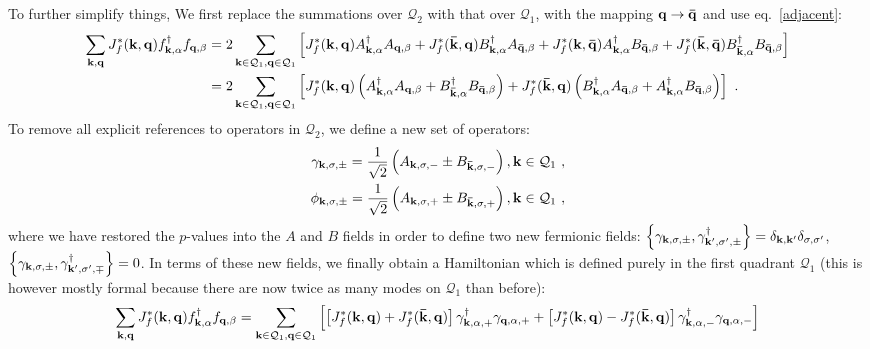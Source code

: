 \documentclass[%
reprint,
superscriptaddress,
groupedaddress,
superscriptaddress,
onecolumn,
10pt
]{revtex4-2}
\begin{document}
To further simplify things, We first replace the summations over \(\mathcal{Q}_2\) with that over \(\mathcal{Q}_1\), with the mapping \({\bf q} \to {\bf \bar q}\) and use eq.~\ref{adjacent}:
\begin{equation}\begin{aligned}
	\sum_{{\bf k}, {\bf q}} J_f^*({\bf k},{\bf q}) f^\dagger_{{\bf k},\alpha}f_{{\bf q},\beta} 
	&= 2\sum_{{\bf k} \in \mathcal{Q}_1, {\bf q} \in \mathcal{Q}_1} \left[J_f^*({\bf k},{\bf q}) A^\dagger_{{\bf k},\alpha}A_{{\bf q},\beta} + J_f^*({\bf \bar k},{\bf q}) B^\dagger_{{\bf k},\alpha}A_{{\bf \bar q},\beta} + J_f^*({\bf k},{\bf \bar q}) A^\dagger_{{\bf k},\alpha}B_{{\bf \bar q},\beta} + J_f^*({\bf \bar k},{\bf \bar q}) B^\dagger_{{\bf \bar k},\alpha}B_{{\bf \bar q},\beta}\right]\\
	&= 2\sum_{{\bf k} \in \mathcal{Q}_1, {\bf q} \in \mathcal{Q}_1} \left[J_f^*({\bf k},{\bf q}) \left(A^\dagger_{{\bf k},\alpha}A_{{\bf q},\beta} + B^\dagger_{{\bf \bar k},\alpha}B_{{\bf \bar q},\beta}\right) + J_f^*({\bf \bar k},{\bf q}) \left(B^\dagger_{{\bf k},\alpha}A_{{\bf \bar q},\beta} + A^\dagger_{{\bf k},\alpha}B_{{\bf \bar q},\beta}\right)\right] ~.
\end{aligned}\end{equation}
To remove all explicit references to operators in \(\mathcal{Q}_2\), we define a new set of operators:
\begin{equation}\begin{aligned}\label{defineGamma}
	\gamma_{{\bf k},\sigma,\pm} = \frac{1}{\sqrt{2}}\left(A_{{\bf k},\sigma,-} \pm B_{{\bf \bar k},\sigma,-}\right), {\bf k}\in \mathcal{Q}_1~,\\
	\phi_{{\bf k},\sigma,\pm} = \frac{1}{\sqrt{2}}\left(A_{{\bf k},\sigma,+} \pm B_{{\bf \bar k},\sigma,+}\right), {\bf k}\in \mathcal{Q}_1~,
\end{aligned}\end{equation}
where we have restored the \(p\)-values into the \(A\) and \(B\) fields in order to define two new fermionic fields: \(\left\{\gamma_{{\bf k},\sigma,\pm}, \gamma_{{\bf k}^\prime,\sigma^\prime,\pm}^\dagger\right\} = \delta_{{\bf k},{\bf k}^\prime}\delta_{\sigma,\sigma^\prime}\), \(\left\{\gamma_{{\bf k},\sigma,\pm}, \gamma_{{\bf k}^\prime,\sigma^\prime,\mp}^\dagger\right\} = 0\). In terms of these new fields, we finally obtain a Hamiltonian which is defined purely in the first quadrant \(\mathcal{Q}_1\) (this is however mostly formal because there are now twice as many modes on \(\mathcal{Q}_1\) than before):
\begin{equation}\begin{aligned}
	\sum_{{\bf k}, {\bf q}} J_f^*({\bf k},{\bf q}) f^\dagger_{{\bf k},\alpha}f_{{\bf q},\beta} 
	&= \sum_{{\bf k} \in \mathcal{Q}_1, {\bf q} \in \mathcal{Q}_1} \left[\left[J_f^*({\bf k},{\bf q}) + J_f^*({\bf \bar k},{\bf q})\right] \gamma^\dagger_{{\bf k},\alpha,+}\gamma_{{\bf q},\alpha,+} + \left[J_f^*({\bf k},{\bf q}) - J_f^*({\bf \bar k},{\bf q})\right] \gamma^\dagger_{{\bf k},\alpha,-}\gamma_{{\bf q},\alpha,-}\right] \\
\end{aligned}\end{equation}
\end{document}
